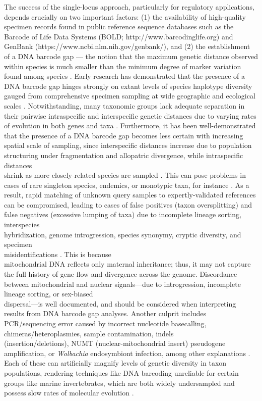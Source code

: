 \documentclass[12pt]{article}
\begin{document}
The success of the single-locus approach, particularly for regulatory applications, depends crucially on two important factors: (1) the availability of high-quality specimen records found in public reference sequence databases such as the Barcode of Life Data Systems (BOLD; http://www.barcodinglife.org) \citep{ratnasingham2007bold} and GenBank (https://www.ncbi.nlm.nih.gov/genbank/), and (2) the establishment of a DNA barcode gap --- the notion that the maximum genetic distance observed within species is much smaller than the minimum degree of marker variation found among species \citep{meyer2005dna, meier2008use}. Early research has demonstrated that the presence of a DNA barcode gap hinges strongly on extant levels of species haplotype diversity gauged from comprehensive specimen sampling at wide geographic and ecological scales \citep{bergsten2012effect, candek2015dna, chen2022large}. Notwithstanding, many taxonomic groups lack adequate separation in their pairwise intraspecific and interspecific genetic distances due to varying rates of evolution in both genes and taxa \citep{pentinsaari2016molecular}. Furthermore, it has been well-demonstrated that the presence of a DNA barcode gap becomes less certain with increasing spatial scale of sampling, since interspecific distances increase due to population structuring under fragmentation and allopatric divergence, while intraspecific distances \\ shrink as more closely-related species are sampled \citep{phillips2022lack}. This can pose problems in cases of rare singleton species, endemics, or monotypic taxa, for instance \citep{ahrens2016rarity}.  As a result, rapid matching of unknown query samples to expertly-validated references can be compromised, leading to cases of false positives (taxon oversplitting) and false negatives (excessive lumping of taxa) due to incomplete lineage sorting, interspecies \\ hybridization, genome introgression, species synonymy, cryptic diversity, and specimen \\ misidentifications \citep{hubert2015dna, phillips2022lack}. This is because \\ mitochondrial DNA reflects only maternal inheritance; thus, it may not capture the full history of gene flow and divergence across the genome. Discordance between mitochondrial and nuclear signals---due to introgression, incomplete lineage sorting, or sex-biased \\ dispersal---is well documented, and should be considered when interpreting results from DNA barcode gap analyses. Another culprit includes PCR/sequencing error caused by incorrect nucleotide basecalling, chimeras/heteroplasmies, sample contamination, indels \\ (insertion/deletions), NUMT (nuclear-mitochondrial insert) pseudogene amplification, or \textit{Wolbachia} endosymbiont infection, among other explanations \citep{phillips2023vlf}. Each of these can artificially magnify levels of genetic diversity in taxon populations, rendering techniques like DNA barcoding unreliable for certain groups like marine invertebrates, which are both widely undersampled and possess slow rates of molecular evolution \citep{bucklin2011dna}.
\end{document}
